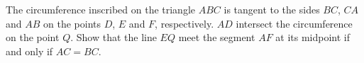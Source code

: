 The circumference inscribed on the triangle $ABC$ is tangent to the sides $BC$,  $CA$ and $AB$ on the points $D$,  $E$ and $F$,  respectively. $AD$ intersect the circumference on the point $Q$. Show that the line $EQ$ meet the segment $AF$ at its midpoint if and only if $AC=BC$.